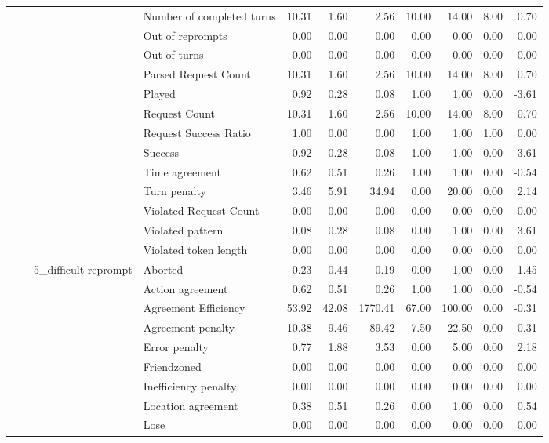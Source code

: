 \begin{tabular}{llllrrrrrrr}
 &  &  & Number of completed turns & 10.31 & 1.60 & 2.56 & 10.00 & 14.00 & 8.00 & 0.70 \\
 &  &  & Out of reprompts & 0.00 & 0.00 & 0.00 & 0.00 & 0.00 & 0.00 & 0.00 \\
 &  &  & Out of turns & 0.00 & 0.00 & 0.00 & 0.00 & 0.00 & 0.00 & 0.00 \\
 &  &  & Parsed Request Count & 10.31 & 1.60 & 2.56 & 10.00 & 14.00 & 8.00 & 0.70 \\
 &  &  & Played & 0.92 & 0.28 & 0.08 & 1.00 & 1.00 & 0.00 & -3.61 \\
 &  &  & Request Count & 10.31 & 1.60 & 2.56 & 10.00 & 14.00 & 8.00 & 0.70 \\
 &  &  & Request Success Ratio & 1.00 & 0.00 & 0.00 & 1.00 & 1.00 & 1.00 & 0.00 \\
 &  &  & Success & 0.92 & 0.28 & 0.08 & 1.00 & 1.00 & 0.00 & -3.61 \\
 &  &  & Time agreement & 0.62 & 0.51 & 0.26 & 1.00 & 1.00 & 0.00 & -0.54 \\
 &  &  & Turn penalty & 3.46 & 5.91 & 34.94 & 0.00 & 20.00 & 0.00 & 2.14 \\
 &  &  & Violated Request Count & 0.00 & 0.00 & 0.00 & 0.00 & 0.00 & 0.00 & 0.00 \\
 &  &  & Violated pattern & 0.08 & 0.28 & 0.08 & 0.00 & 1.00 & 0.00 & 3.61 \\
 &  &  & Violated token length & 0.00 & 0.00 & 0.00 & 0.00 & 0.00 & 0.00 & 0.00 \\
\cline{3-11}
 &  & \multirow[t]{27}{*}{5_difficult-reprompt} & Aborted & 0.23 & 0.44 & 0.19 & 0.00 & 1.00 & 0.00 & 1.45 \\
 &  &  & Action agreement & 0.62 & 0.51 & 0.26 & 1.00 & 1.00 & 0.00 & -0.54 \\
 &  &  & Agreement Efficiency & 53.92 & 42.08 & 1770.41 & 67.00 & 100.00 & 0.00 & -0.31 \\
 &  &  & Agreement penalty & 10.38 & 9.46 & 89.42 & 7.50 & 22.50 & 0.00 & 0.31 \\
 &  &  & Error penalty & 0.77 & 1.88 & 3.53 & 0.00 & 5.00 & 0.00 & 2.18 \\
 &  &  & Friendzoned & 0.00 & 0.00 & 0.00 & 0.00 & 0.00 & 0.00 & 0.00 \\
 &  &  & Inefficiency penalty & 0.00 & 0.00 & 0.00 & 0.00 & 0.00 & 0.00 & 0.00 \\
 &  &  & Location agreement & 0.38 & 0.51 & 0.26 & 0.00 & 1.00 & 0.00 & 0.54 \\
 &  &  & Lose & 0.00 & 0.00 & 0.00 & 0.00 & 0.00 & 0.00 & 0.00 \\

\end{tabular}
